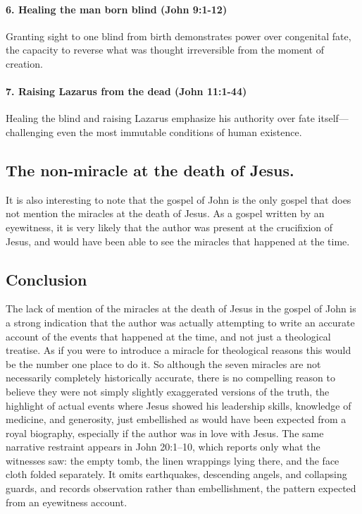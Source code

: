\paragraph{6. Healing the man born blind (John 9:1-12)} Granting sight to one blind from birth demonstrates power over congenital fate, the capacity to reverse what was thought irreversible from the moment of creation.

\paragraph{7. Raising Lazarus from the dead (John 11:1-44)} Healing the blind and raising Lazarus emphasize his authority over fate itself---challenging even the most immutable conditions of human existence.

\subsection{The non-miracle at the death of Jesus.}\label{subsec:the-non-miracle-at-the-death-of-jesus.}

It is also interesting to note that the gospel of John is the only gospel that does not mention the miracles at the death of Jesus.
As a gospel written by an eyewitness, it is very likely that the author was present at the crucifixion of Jesus, and would have been able to see the miracles that happened at the time.

\subsection{Conclusion}\label{subsec:conclusion}

The lack of mention of the miracles at the death of Jesus in the gospel of John is a strong indication that the author was actually attempting to write an accurate account of the events that happened at the time, and not just a theological treatise.
As if you were to introduce a miracle for theological reasons this would be the number one place to do it.
So although the seven miracles are not necessarily completely historically accurate, there is no compelling reason to believe they were not simply slightly exaggerated versions of the truth, the highlight of actual events where Jesus showed his leadership skills, knowledge of medicine, and generosity, just embellished as would have been expected from a royal biography, especially if the author was in love with Jesus.
The same narrative restraint appears in John 20:1--10, which reports only what the witnesses saw: the empty tomb, the linen wrappings lying there, and the face cloth folded separately.
It omits earthquakes, descending angels, and collapsing guards, and records observation rather than embellishment, the pattern expected from an eyewitness account.

